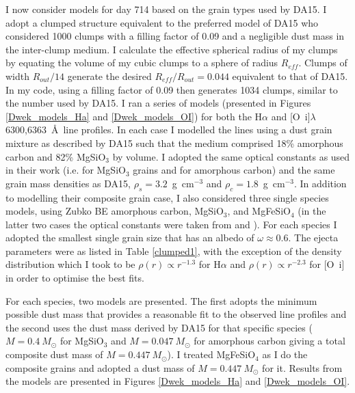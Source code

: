 I now consider models for day 714 based on the grain types
used by DA15.  I adopt a clumped structure equivalent to the 
preferred model of DA15 who considered 1000 clumps with a filling factor of 
0.09 and a negligible dust mass in the inter-clump medium.  I calculate 
the effective spherical radius of my clumps by equating the volume of my 
cubic clumps to a sphere of radius $R_{eff}$.  Clumps of width 
$R_{out}/14$ generate the desired $R_{eff}/R_{out}=0.044$ equivalent to 
that of DA15.  In my code, using a filling factor of 0.09 then generates 
1034 clumps, similar to the number used by DA15.  I ran a series of models 
(presented in Figures \ref{Dwek_models_Ha} and \ref{Dwek_models_OI}) for 
both the H$\alpha$ and [O~{\sc i}]$\lambda$6300,6363~\AA\ line profiles.  
In each case I modelled the lines using a dust grain mixture as described 
by DA15 such that the medium comprised 18\% amorphous carbon and 82\% 
MgSiO$_3$ by volume.  I adopted the same optical constants as used in 
their work (i.e. \citet{Jager2003} for MgSiO$_3$ grains and 
\citet{Zubko1996} for amorphous carbon) and the same grain mass densities as DA15, 
$\rho_s=3.2$~g~cm$^{-3}$ and $\rho_c=1.8$~g~cm$^{-3}$.  In addition to 
modelling their composite grain case, I also considered three single 
species models, using Zubko BE amorphous carbon, MgSiO$_3$, and 
MgFeSiO$_4$ (in the latter two cases the optical constants were taken from 
\citet{Jager1994} and \citet{Dorschner1995}). For each species I 
adopted the smallest single grain size that has an albedo of $\omega 
\approx 0.6$. The ejecta 
parameters were as listed in Table \ref{clumped1}, with the exception of 
the density distribution which I took to be $\rho(r) \propto r^{-1.3}$ 
for H$\alpha$ and $\rho(r) \propto r^{-2.3}$ for [O~{\sc i}] in order to 
optimise the best fits.

For each species, two models are presented.  The first adopts the minimum 
possible dust mass that provides a reasonable fit to the observed line 
profiles and the second uses the dust mass derived by DA15 for that 
specific species ($M=0.4~M_{\odot}$ for MgSiO$_3$ and $M=0.047~M_{\odot}$ 
for amorphous carbon giving a total composite dust mass of 
$M=0.447~M_{\odot}$).  I treated MgFeSiO$_4$ as I do the composite 
grains and adopted a dust mass of $M=0.447~M_{\odot}$ for it.  Results 
from the models are presented in Figures \ref{Dwek_models_Ha} and 
\ref{Dwek_models_OI}.






